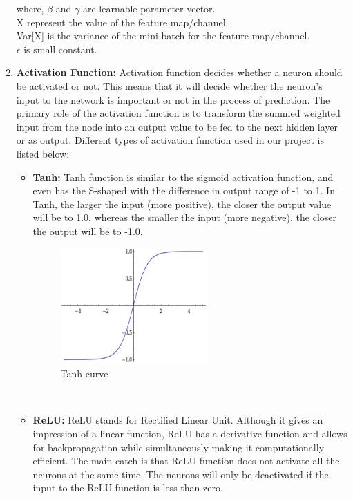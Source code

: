 \begin{enumerate}[label=(\roman*)]
        where, $\beta$ and $\gamma$ are learnable parameter vector. \\ 
        X represent the value of the feature map/channel.\\
        Var[X] is the variance of the mini batch for the feature map/channel.\\
        $\epsilon$ is small constant.\\
        \item {\bf Activation Function:} Activation function decides whether a neuron should be activated or not. This means that it will decide whether the neuron’s input to the network is important or not in the process of prediction. The primary role of the activation function is to transform the summed weighted input from the node into an output value to be fed to the next hidden layer or as output. Different types of activation function used in our project is listed below:
        \begin{itemize}
            \item {\bf Tanh:} Tanh function is similar to the sigmoid activation function, and even has the S-shaped with the difference in output range of -1 to 1. In Tanh, the larger the input (more positive), the closer the output value will be to 1.0, whereas the smaller the input (more negative), the closer the output will be to -1.0. 
            \begin{figure}[ht]
                \centering
                \includegraphics[width=2.2in]{./figures/tanhcurve.png}
                \caption{ Tanh curve}
            \end{figure} \\
            \item {\bf ReLU:} ReLU stands for Rectified Linear Unit. Although it gives an impression of a linear function, ReLU has a derivative function and allows for backpropagation while simultaneously making it computationally efficient. The main catch is that ReLU function does not activate all the neurons at the same time. The neurons will only be deactivated if the input to the ReLU function is less than zero. \cite{r6}

\end{itemize}
\end{enumerate}
